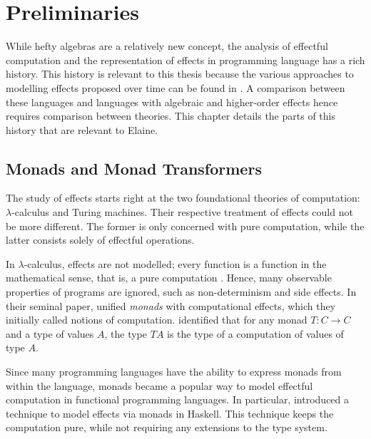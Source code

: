 \chapter{Preliminaries}\label{chap:preliminaries}

While hefty algebras are a relatively new concept, the analysis of effectful computation and the representation of effects in programming language has a rich history. This history is relevant to this thesis because the various approaches to modelling effects proposed over time can be found in . A comparison between these languages and languages with algebraic and higher-order effects hence requires comparison between theories. This chapter details the parts of this history that are relevant to Elaine.

\section{Monads and Monad Transformers}


The study of effects starts right at the two foundational theories of computation: $\lambda$-calculus and Turing machines. Their respective treatment of effects could not be more different. The former is only concerned with pure computation, while the latter consists solely of effectful operations.

In $\lambda$-calculus, effects are not modelled; every function is a function in the mathematical sense, that is, a pure computation \autocite{moggi_computational_1989}. Hence, many observable properties of programs are ignored, such as non-determinism and side effects. In their seminal paper, \textcite{moggi_computational_1989} unified \emph{monads} with computational effects, which they initially called notions of computation. \citeauthor{moggi_computational_1989} identified that for any monad $T: C \to C$ and a type of values $A$, the type $T A$ is the type of a computation of values of type $A$.

Since many programming languages have the ability to express monads from within the language, monads became a popular way to model effectful computation in functional programming languages. In particular, \textcite{peyton_jones_imperative_1993} introduced a technique to model effects via monads in Haskell. This technique keeps the computation pure, while not requiring any extensions to the type system.

